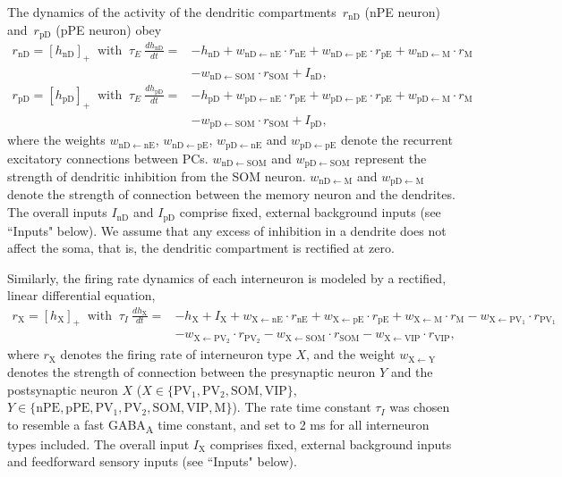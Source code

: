 \documentclass[10pt,a4paper]{article}
\begin{document}
The dynamics of the activity of the dendritic compartments~$r_\mathrm{nD}$ (nPE neuron) and~$r_\mathrm{pD}$ (pPE neuron) obey \citep{wilson1972excitatory}
%
\begin{align}
r_\mathrm{nD} = [h_\mathrm{nD}]_+ \ \mbox{ with }\ \tau_E\ \frac{dh_\mathrm{nD}}{dt} =& - h_\mathrm{nD} +  w_\mathrm{nD\leftarrow nE}\cdot r_\mathrm{nE} +  w_\mathrm{nD\leftarrow pE}\cdot r_\mathrm{pE} + w_\mathrm{nD\leftarrow M}\cdot  r_\mathrm{M} \nonumber\\
& - w_\mathrm{nD\leftarrow SOM}\cdot r_\mathrm{SOM} + I_\mathrm{nD}, \nonumber\\
r_\mathrm{pD} = [h_\mathrm{pD}]_+ \ \mbox{ with }\ \tau_E\ \frac{dh_\mathrm{pD}}{dt} =& - h_\mathrm{pD} +  w_\mathrm{pD\leftarrow nE}\cdot r_\mathrm{pE} +  w_\mathrm{pD\leftarrow pE}\cdot r_\mathrm{pE}+ w_\mathrm{pD\leftarrow M}\cdot  r_\mathrm{M}  \nonumber\\
&- w_\mathrm{pD\leftarrow SOM}\cdot r_\mathrm{SOM} + I_\mathrm{pD},
\end{align}
%
where the weights $w_{\mathrm{nD\leftarrow nE}}$, $w_{\mathrm{nD\leftarrow pE}}$, $w_{\mathrm{pD\leftarrow nE}}$ and $w_{\mathrm{pD\leftarrow pE}}$ denote the recurrent excitatory connections between PCs. $w_{\mathrm{nD\leftarrow SOM}}$ and $w_{\mathrm{pD\leftarrow SOM}}$ represent the strength of dendritic inhibition from the SOM neuron. $w_{\mathrm{nD\leftarrow M}}$ and $w_{\mathrm{pD\leftarrow M}}$ denote the strength of connection between the memory neuron and the dendrites. The overall inputs $I_\mathrm{nD}$ and $I_\mathrm{pD}$ comprise fixed, external background inputs (see ``Inputs" below). We assume that any excess of inhibition in a dendrite does not affect the soma, that is, the dendritic compartment is rectified at zero. 

Similarly, the firing rate dynamics of each interneuron is modeled by a rectified, linear differential equation,
%
\begin{align}
\label{eq:RateEqINs}
r_\mathrm{X} = [h_\mathrm{X}]_+ \ \mbox{ with }\ \tau_I\ \frac{dh_\mathrm{X}}{dt} =& -h_\mathrm{X} + I_{\mathrm{X}} + w_\mathrm{X\leftarrow nE}\cdot r_\mathrm{nE} + w_\mathrm{X\leftarrow pE}\cdot r_\mathrm{pE}  +  w_\mathrm{X\leftarrow M}\cdot  r_\mathrm{M} - w_\mathrm{X\leftarrow PV_1}\cdot r_\mathrm{PV_1}  \nonumber\\
&- w_\mathrm{X\leftarrow PV_2}\cdot r_\mathrm{PV_2}  - w_\mathrm{X\leftarrow SOM}\cdot r_\mathrm{SOM} -  w_\mathrm{X\leftarrow VIP}\cdot r_\mathrm{VIP},
\end{align}
%
where $r_\mathrm{X}$ denotes the firing rate of interneuron type $X$, and the weight $w_\mathrm{X\leftarrow Y}$ denotes the strength of connection between the presynaptic neuron $Y$ and the postsynaptic neuron $X$ ($X \in \lbrace \mathrm{PV_1}, \mathrm{PV_2}, \mathrm{SOM}, \mathrm{VIP}\rbrace$, $Y\in \lbrace \mathrm{nPE}, \mathrm{pPE}, \mathrm{PV_1}, \mathrm{PV_2}, \mathrm{SOM}, \mathrm{VIP}, \mathrm{M}\rbrace$). The rate time constant $\tau_I$ was chosen to resemble a fast GABA\textsubscript{A} time constant, and set to 2 ms for all interneuron types included. The overall input $I_\mathrm{X}$ comprises fixed, external background inputs and feedforward sensory inputs (see ``Inputs" below).
\end{document}
